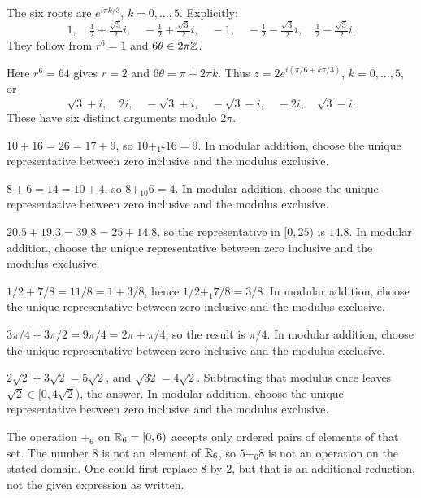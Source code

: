 
The six roots are $e^{i\pi k/3}$, $k=0,\ldots,5$. Explicitly:
\[1,\quad\tfrac12+\tfrac{\sqrt3}{2}i,\quad-\tfrac12+\tfrac{\sqrt3}{2}i,\quad-1,\quad-\tfrac12-\tfrac{\sqrt3}{2}i,\quad\tfrac12-\tfrac{\sqrt3}{2}i.
\]
They follow from $r^6=1$ and $6\theta\in2\pi\mathbb{Z}$.


Here $r^6=64$ gives $r=2$ and $6\theta=\pi+2\pi k$. Thus $z=2e^{i(\pi/6+k\pi/3)}$, $k=0,\ldots,5$, or
\[\sqrt3+i,\quad2i,\quad-\sqrt3+i,\quad-\sqrt3-i,\quad-2i,\quad\sqrt3-i.
\]
These have six distinct arguments modulo $2\pi$.


$10+16=26=17+9$, so $10+_{17}16=9$. In modular addition, choose the unique representative between zero inclusive and the modulus exclusive.


$8+6=14=10+4$, so $8+_{10}6=4$. In modular addition, choose the unique representative between zero inclusive and the modulus exclusive.


$20.5+19.3=39.8=25+14.8$, so the representative in $[0,25)$ is $14.8$. In modular addition, choose the unique representative between zero inclusive and the modulus exclusive.


$1/2+7/8=11/8=1+3/8$, hence $1/2+_1 7/8=3/8$. In modular addition, choose the unique representative between zero inclusive and the modulus exclusive.


$3\pi/4+3\pi/2=9\pi/4=2\pi+\pi/4$, so the result is $\pi/4$. In modular addition, choose the unique representative between zero inclusive and the modulus exclusive.


$2\sqrt2+3\sqrt2=5\sqrt2$, and $\sqrt{32}=4\sqrt2$. Subtracting that modulus once leaves $\sqrt2\in[0,4\sqrt2)$, the answer. In modular addition, choose the unique representative between zero inclusive and the modulus exclusive.


The operation $+_6$ on $\mathbb{R}_6=[0,6)$ accepts only ordered pairs of elements of that set. The number $8$ is not an element of $\mathbb{R}_6$, so $5+_6 8$ is not an operation on the stated domain. One could first replace $8$ by $2$, but that is an additional reduction, not the given expression as written.

